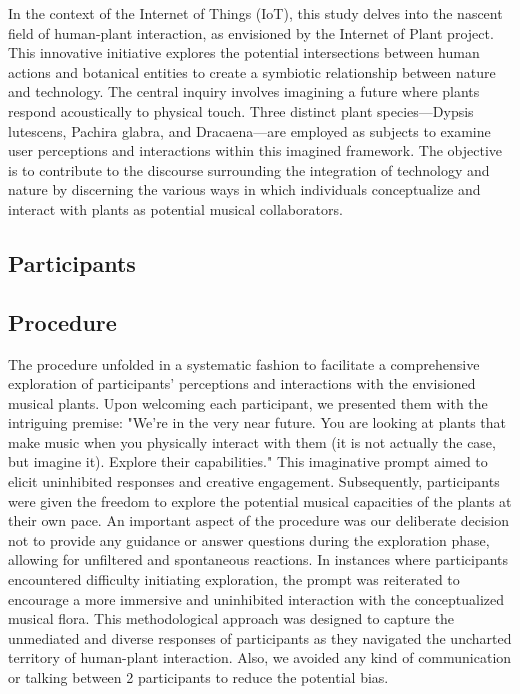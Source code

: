 In the context of the Internet of Things (IoT), this study delves into the nascent field of human-plant interaction, as envisioned by the Internet of Plant project. 
This innovative initiative explores the potential intersections between human actions and botanical entities to create a symbiotic relationship between nature and technology. 
The central inquiry involves imagining a future where plants respond acoustically to physical touch. 
Three distinct plant species—Dypsis lutescens, Pachira glabra, and Dracaena—are employed as subjects to examine user perceptions and interactions within this imagined framework. 
The objective is to contribute to the discourse surrounding the integration of technology and nature by discerning the various ways in which individuals conceptualize and interact with plants as potential musical collaborators.



\subsection{Participants}




\subsection{Procedure}

The procedure unfolded in a systematic fashion to facilitate a comprehensive exploration of participants' perceptions and interactions with the envisioned musical plants. Upon welcoming each participant, we presented them with the intriguing premise: "We're in the very near future. You are looking at plants that make music when you physically interact with them (it is not actually the case, but imagine it). Explore their capabilities." This imaginative prompt aimed to elicit uninhibited responses and creative engagement. Subsequently, participants were given the freedom to explore the potential musical capacities of the plants at their own pace. An important aspect of the procedure was our deliberate decision not to provide any guidance or answer questions during the exploration phase, allowing for unfiltered and spontaneous reactions. In instances where participants encountered difficulty initiating exploration, the prompt was reiterated to encourage a more immersive and uninhibited interaction with the conceptualized musical flora. This methodological approach was designed to capture the unmediated and diverse responses of participants as they navigated the uncharted territory of human-plant interaction. Also, we avoided any kind of communication or talking between 2 participants to reduce the potential bias.


